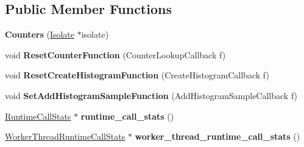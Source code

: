 \subsection*{Public Member Functions}
\begin{DoxyCompactItemize}
\item 
\mbox{\label{classv8_1_1internal_1_1Counters_aca23c145a8573652dfffeb173824a62f}} 
{\bfseries Counters} (\mbox{\hyperlink{classv8_1_1internal_1_1Isolate}{Isolate}} $\ast$isolate)
\item 
\mbox{\label{classv8_1_1internal_1_1Counters_a89b14541bebe49cc584de3ba75c8c61f}} 
void {\bfseries Reset\+Counter\+Function} (Counter\+Lookup\+Callback f)
\item 
\mbox{\label{classv8_1_1internal_1_1Counters_a855ac4ee9c5b311fab0d4cc207d3f259}} 
void {\bfseries Reset\+Create\+Histogram\+Function} (Create\+Histogram\+Callback f)
\item 
\mbox{\label{classv8_1_1internal_1_1Counters_a3e56c5c0bccdbe0c9acd231a2950d6d4}} 
void {\bfseries Set\+Add\+Histogram\+Sample\+Function} (Add\+Histogram\+Sample\+Callback f)
\item 
\mbox{\label{classv8_1_1internal_1_1Counters_aa27049ebe05a1e1a0df0d0a03f679b9d}} 
\mbox{\hyperlink{classv8_1_1internal_1_1RuntimeCallStats}{Runtime\+Call\+Stats}} $\ast$ {\bfseries runtime\+\_\+call\+\_\+stats} ()
\item 
\mbox{\label{classv8_1_1internal_1_1Counters_a0bdb4316dbf629e531d98a7a6446702b}} 
\mbox{\hyperlink{classv8_1_1internal_1_1WorkerThreadRuntimeCallStats}{Worker\+Thread\+Runtime\+Call\+Stats}} $\ast$ {\bfseries worker\+\_\+thread\+\_\+runtime\+\_\+call\+\_\+stats} ()
\end{DoxyCompactItemize}
